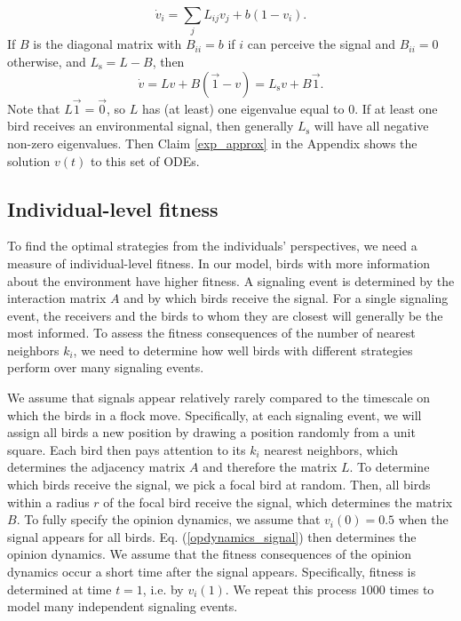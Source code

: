 \documentclass{article}
\begin{document}
\begin{equation*}
\dot{v}_i=\sum_jL_{ij}v_j+b(1-v_i).
\end{equation*}
If $B$ is the diagonal matrix with $B_{ii}=b$ if $i$ can perceive the signal and $B_{ii}=0$ otherwise, and $L_\text{s}=L-B$, then
\begin{equation}
\dot{v}=Lv+B(\vec{1}-v)=L_\text{s}v+B\vec{1}. \label{opdynamics_signal}
\end{equation}
Note that $L\vec{1}=\vec{0}$, so $L$ has (at least) one eigenvalue equal to $0$. If at least one bird receives an environmental signal, then generally $L_\text{s}$ will have all negative non-zero eigenvalues. Then Claim \ref{exp_approx} in the Appendix shows the solution $v(t)$ to this set of ODEs.


\subsection{Individual-level fitness }
To find the optimal strategies from the individuals' perspectives, we need a measure of individual-level fitness. In our model, birds with more information about the environment have higher fitness.   A signaling event is determined by the interaction matrix $A$ and by which birds receive the signal. For a single signaling event, the receivers and the birds to whom they are closest will generally be the most informed. To assess the fitness consequences of the number of nearest neighbors $k_i$, we need to determine how well birds with different strategies perform over many signaling events.

We assume that signals appear relatively rarely compared to the timescale on which the birds in a flock move. Specifically, at each signaling event, we will assign all birds a new position by drawing a position randomly from a unit square. Each bird then pays attention to its $k_i$ nearest neighbors, which determines the adjacency matrix $A$ and therefore the matrix $L$. To determine which birds receive the signal, we pick a focal bird at random. Then, all birds within a radius $r$ of the focal bird receive the signal, which determines the matrix $B$.   To fully specify the opinion dynamics, we assume that $v_i(0)=0.5$ when the signal appears for all birds. Eq. (\ref{opdynamics_signal}) then determines the opinion dynamics. We assume that the fitness consequences of the opinion dynamics occur a short time after the signal appears. Specifically, fitness is determined at time $t=1$, i.e. by $v_i(1)$. We repeat this process $1000$ times to model many independent signaling events.
\end{document}
